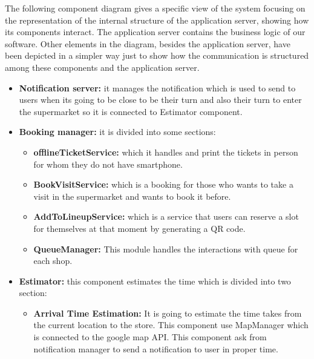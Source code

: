 The following component diagram gives a specific view of the system focusing on the representation of the internal structure of the application server, showing how its components interact. The application server contains the business logic of our software. Other elements in the diagram, besides the application server, have been depicted in a simpler way just to show how the communication is structured among these components and the application server.
\begin{itemize}

    \item \textbf{Notification server:} it manages the notification which is used to send to users when its going to be close to be their turn and also their turn to enter the supermarket so it is connected to Estimator component.\\ 
    
    \item \textbf{Booking manager:}  it is divided into some sections:
    \begin{itemize}
        \item \textbf{offlineTicketService:} which it handles and print the tickets in person for whom they do not have smartphone. \\
        \item \textbf{BookVisitService:} which is a booking for those who wants to take a visit in the supermarket and wants to book it before. \\
        \item \textbf{AddToLineupService:} which is a service that users can reserve a slot for themselves at that moment by generating a QR code.\\
        \item \textbf{QueueManager:} This module handles the interactions with queue for each shop.
    \end{itemize}
    
    \item \textbf{Estimator:} this component estimates the time which is divided into two section:
    \begin{itemize}
        \item \textbf{Arrival Time Estimation:} It is going to estimate the time takes from the current location to the store. This component use MapManager which is connected to the google map API. This component ask from notification manager to send a notification to user in proper time.\\
        

\end{itemize}
\end{itemize}
